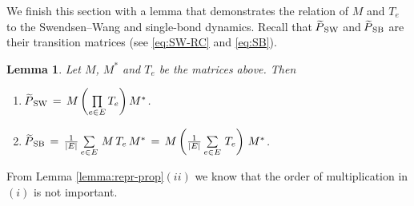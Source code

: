 \documentclass{dis}
\newtheorem{lemma}[theorem]{Lemma}
\theoremstyle{citing}
\begin{document}
We finish this section with a lemma that demonstrates the 
relation of $M$ and $T_e$ to the 
Swendsen--Wang and single-bond dynamics.
Recall that ${{\raisebox{2pt}{ ${\widetilde{{}}}$ }\mkern-14mu P}_{\rm SW}}$ and ${{\raisebox{2pt}{ ${\widetilde{{}}}$ }\mkern-14mu P}_{\rm SB}}$ are their transition matrices 
(see \eqref{eq:SW-RC} and \eqref{eq:SB}).

\begin{lemma} \label{lemma:repr}
Let $M$, $M^*$ and $T_e$ be the matrices above.
Then
\begin{enumerate}
	
	\item ${{\raisebox{2pt}{ ${\widetilde{{}}}$ }\mkern-14mu P}_{\rm SW}} \,=\, M \left(\prod\limits_{e\in E} T_e\right) M^*$.
\vspace{1mm}
	\item ${{\raisebox{2pt}{ ${\widetilde{{}}}$ }\mkern-14mu P}_{\rm SB}} 
			\,=\, \frac1{{\left\vert {E} \right\vert}}\sum\limits_{e\in E}\,M\,T_e\,M^*
			\,=\, M\left(\frac1{{\left\vert {E} \right\vert}}\sum\limits_{e\in E}\,T_e\right)\,M^*$.
\end{enumerate}
\end{lemma}
\vspace{2mm}

From Lemma \ref{lemma:repr-prop}$(ii)$ we know that the order of multiplication 
in $(i)$ is not important.
\end{document}
